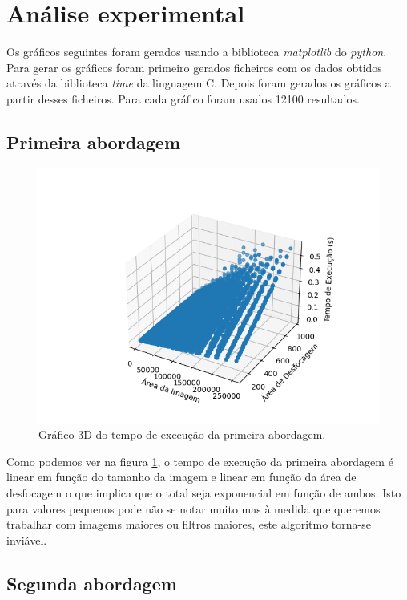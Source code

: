 \section{Análise experimental}
\label{sec:imageblur/experimental}

Os gráficos seguintes foram gerados usando a biblioteca \textit{matplotlib} do \textit{python}. Para gerar os gráficos foram primeiro gerados ficheiros com os dados obtidos através da biblioteca \textit{time} da linguagem C. Depois foram gerados os gráficos a partir desses ficheiros. Para cada gráfico foram usados 12100 resultados.

\subsection{Primeira abordagem}

\begin{figure}[H]
    \centering
    \includegraphics[width=\linewidth]{images/first-3d_plot.png}
    \caption{Gráfico 3D do tempo de execução da primeira abordagem.}
    \label{fig:imageblur/first-3d_plot}
\end{figure}

Como podemos ver na figura \ref{fig:imageblur/first-3d_plot}, o tempo de execução da primeira abordagem é linear em função do tamanho da imagem e linear em função da área de desfocagem o que implica que o total seja exponencial em função de ambos. Isto para valores pequenos pode não se notar muito mas à medida que queremos trabalhar com imagems maiores ou filtros maiores, este algoritmo torna-se inviável.

\subsection{Segunda abordagem}

